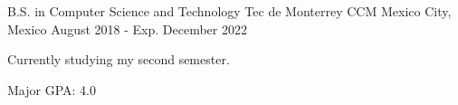 

\begin{cventries}

\cventry
    {B.S. in Computer Science and Technology} %
    {Tec de Monterrey CCM} %
    {Mexico City, Mexico} %
    {August 2018 - Exp. December 2022} %
    {
      \begin{cvitems} %
        \item {Currently studying my second semester.}
        \item {Major GPA: 4.0}
      \end{cvitems}
    }


\end{cventries}
